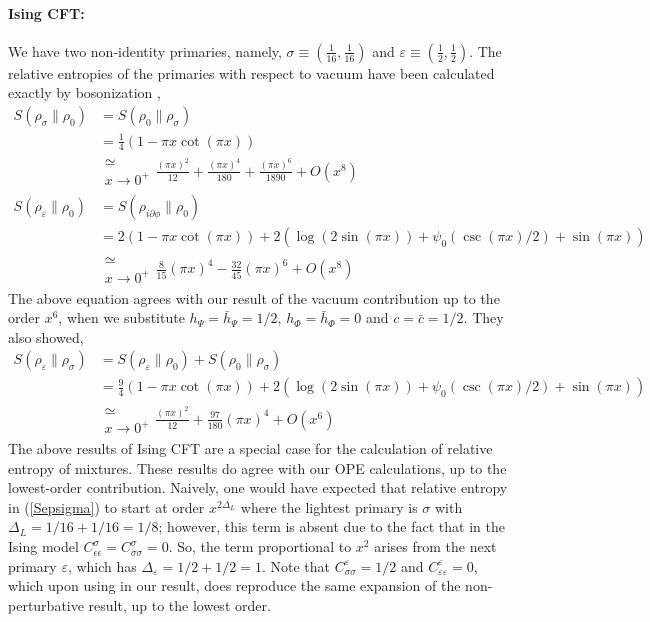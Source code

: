 \documentclass[11pt]{article}
\newcommand{\ep}{\epsilon}
\newcommand{\p}{\partial}
\newcommand{\lb}{\left(}
\newcommand{\rb}{\right)}
\begin{document}
  \paragraph{Ising CFT:} We have two non-identity primaries, namely, $\sigma \equiv
 \lb \frac{1}{16}, \frac{1}{16}\rb$ and $\varepsilon\equiv \lb \frac{1}{2},\frac{1}{2}\rb$. The relative entropies of the primaries with respect to vacuum have been calculated exactly by bosonization \cite{Nakagawa_2017},
 \begin{align}
     S(\rho_\sigma\| \rho_0) &= S(\rho_0\| \rho_\sigma)  \\
     &=\frac{1}{4}(1-\pi x \cot(\pi x)) \\
     &\substack{\simeq \\x\to 0^+} \frac{(\pi x)^2}{12} + \frac{(\pi x)^4}{180} + \frac{(\pi x)^6}{1890} + O(x^8) \\
     S(\rho_\varepsilon \| \rho_0) &= S(\rho_{i \p \phi}\| \rho_0) \\
     &= 2(1-\pi x \cot(\pi x))+2\lb \log(2\sin(\pi x))+\psi_0(\csc(\pi x)/2)+\sin(\pi x)\rb\\
      &\substack{\simeq \\x\to 0^+} \frac{8}{15}(\pi x)^4  -\frac{32}{45}\lb \pi x \rb^6  + O(x^8)
 \end{align}
 The above equation agrees with our result of the vacuum contribution up to the order $x^6$, when we substitute $h_\Psi = \bar h_\Psi = 1/2$, $h_\Phi = \bar h_\Phi =0$ and $c=\bar c = 1/2$. 
 They also showed,
\begin{align}\label{Sepsigma}
     S(
     \rho_\varepsilon \| \rho_\sigma) &= S(\rho_\varepsilon \| \rho_0) + S(\rho_0 \| \rho_\sigma)  \\
     &= \frac{9}{4}(1-\pi x\cot(\pi x) )+2\lb \log(2\sin(\pi x))+\psi_0(\csc(\pi x)/2)+\sin(\pi x)\rb
     \\&\substack{\simeq \\x\to 0^+} \frac{(\pi x)^2}{12} +  \frac{97}{180}(\pi x)^4 + O(x^6)
 \end{align}
 The above results of Ising CFT are a special case for the calculation of relative entropy of mixtures. These results do agree with our OPE calculations, up to the lowest-order contribution. 
Naively, one would have expected that relative entropy in (\ref{Sepsigma}) to start at order $x^{2\Delta_L}$ where the lightest primary is $\sigma$ with $\Delta_L=1/16+1/16=1/8$; however, this term is absent due to the fact that in the Ising model $C_{\ep\ep}^\sigma=C_{\sigma\sigma}^\sigma=0$. So, the term proportional to $x^2$ arises from the next primary $\varepsilon$, which has $\Delta_\varepsilon = 1/2 + 1/2 = 1$. Note that $C_{\sigma\sigma}^\varepsilon = 1/2$ and $C_{\varepsilon\varepsilon}^\varepsilon = 0$, which upon using in our result, does reproduce the same expansion of the non-perturbative result, up to the lowest order. 
\end{document}
